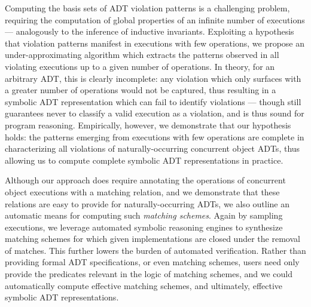 Computing the basis sets of ADT violation patterns is a challenging problem,
requiring the computation of global properties of an infinite number of
executions — analogously to the inference of inductive invariants. Exploiting a
hypothesis that violation patterns manifest in executions with few operations,
we propose an under-approximating algorithm which extracts the patterns observed
in all violating executions up to a given number of operations. In theory, for
an arbitrary ADT, this is clearly incomplete: any violation which only surfaces
with a greater number of operations would not be captured, thus resulting in a
symbolic ADT representation which can fail to identify violations — though still
guarantees never to classify a valid execution as a violation, and is thus sound
for program reasoning. Empirically, however, we demonstrate that our hypothesis
holds: the patterns emerging from executions with few operations are complete in
characterizing all violations of naturally-occurring concurrent object ADTs,
thus allowing us to compute complete symbolic ADT representations in practice.

Although our approach does require annotating the operations of concurrent
object executions with a matching relation, and we demonstrate that these
relations are easy to provide for naturally-occurring ADTs, we also outline an
automatic means for computing such \emph{matching schemes}. Again by sampling
executions, we leverage automated symbolic reasoning engines to synthesize
matching schemes for which given implementations are closed under the removal
of matches. This further lowers the burden of automated verification. Rather
than providing formal ADT specifications, or even matching schemes, users need
only provide the predicates relevant in the logic of matching schemes, and we
could automatically compute effective matching schemes, and ultimately,
effective symbolic ADT representations.

